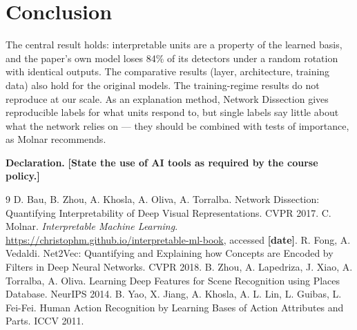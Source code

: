 \documentclass[10pt,a4paper]{article}
\newcommand{\fillin}[1]{\colorbox{yellow!40}{\textbf{[#1]}}}
\begin{document}
\section{Conclusion}
The central result holds: interpretable units are a property of the learned basis, and the paper's own model loses 84\% of
its detectors under a random rotation with identical outputs. The comparative results (layer, architecture, training data)
also hold for the original models. The training-regime results do not reproduce at our scale. As an explanation method,
Network Dissection gives reproducible labels for what units respond to, but single labels say little about what the network
relies on --- they should be combined with tests of importance, as Molnar recommends.

\noindent\textbf{Declaration.} \fillin{State the use of AI tools as required by the course policy.}

\begin{thebibliography}{9}\small
{} D. Bau, B. Zhou, A. Khosla, A. Oliva, A. Torralba. Network Dissection: Quantifying Interpretability of Deep Visual Representations. CVPR 2017.
 C. Molnar. \emph{Interpretable Machine Learning}. \url{https://christophm.github.io/interpretable-ml-book}, accessed \fillin{date}.
 R. Fong, A. Vedaldi. Net2Vec: Quantifying and Explaining how Concepts are Encoded by Filters in Deep Neural Networks. CVPR 2018.
 B. Zhou, A. Lapedriza, J. Xiao, A. Torralba, A. Oliva. Learning Deep Features for Scene Recognition using Places Database. NeurIPS 2014.
 B. Yao, X. Jiang, A. Khosla, A. L. Lin, L. Guibas, L. Fei-Fei. Human Action Recognition by Learning Bases of Action Attributes and Parts. ICCV 2011.
\end{thebibliography}
\end{document}
